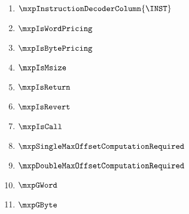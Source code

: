\begin{enumerate}
	\item $\mxpInstructionDecoderColumn{\INST}$
	\item $\mxpIsWordPricing$
	\item $\mxpIsBytePricing$
	\item $\mxpIsMsize$
	\item $\mxpIsReturn$
	\item $\mxpIsRevert$
	\item $\mxpIsCall$
	\item $\mxpSingleMaxOffsetComputationRequired$
	\item $\mxpDoubleMaxOffsetComputationRequired$
	\item $\mxpGWord$
	\item $\mxpGByte$
\end{enumerate}